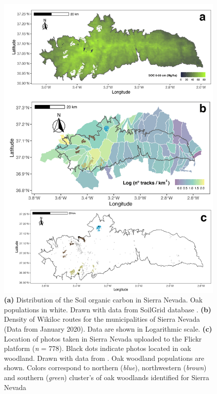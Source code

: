 \begin{figure}
    \centering
    \includegraphics[width=\textwidth]{img/es/es-fig_2_mapas.jpg}
    \caption{\textbf{(a)} Distribution of the Soil organic carbon in Sierra Nevada. Oak populations in white. Drawn with data from SoilGrid database \autocites[see][]{Hengletal2017SoilGrids250mGlobal}. \textbf{(b)} Density of Wikiloc routes for the municipalities of Sierra Nevada (Data from January 2020). Data are shown in Logarithmic scale. \textbf{(c)} Location of photos taken in Sierra Nevada uploaded to the Flickr platform (\emph{n} = 778). Black dots indicate photos located in oak woodland. Drawn with data from \citet{RosCandeiraetal2020SocialMedia}. Oak woodland populations are shown. Colors correspond to northern (\emph{blue}), northwestern (\emph{brown}) and southern (\emph{green}) cluster's of oak woodlands identified for Sierra Nevada \autocite{PerezLuqueetal2021EcologicalDiversity}}\label{fig:es:socwikiloc}
\end{figure}

